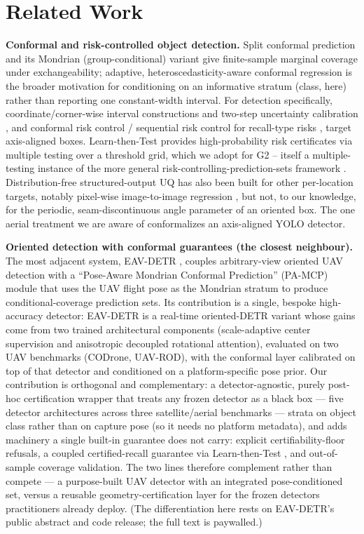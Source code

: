 \documentclass[11pt]{article}
\begin{document}
\section{Related Work}\label{sec:related}
\textbf{Conformal and risk-controlled object detection.} Split conformal prediction \citep{vovk2005algorithmic}
and its Mondrian (group-conditional) variant \citep{vovk2003mondrian} give finite-sample marginal coverage
under exchangeability; adaptive, heteroscedasticity-aware conformal regression \citep{romano2019cqr} is the
broader motivation for conditioning on an informative stratum (class, here) rather than reporting one
constant-width interval. For detection specifically, coordinate/corner-wise interval constructions and two-step
uncertainty calibration \citep{andeol2023conformal,timans2024twostep,ries2026probabilistic}, and conformal
risk control / sequential risk control for recall-type risks \citep{angelopoulos2022crc,andeol2025seqcrc},
target axis-aligned boxes. Learn-then-Test \citep{angelopoulos2021ltt} provides high-probability risk
certificates via multiple testing over a threshold grid, which we adopt for G2 -- itself a multiple-testing
instance of the more general risk-controlling-prediction-sets framework \citep{bates2021rcps}. Distribution-free
structured-output UQ has also been built for other per-location targets, notably pixel-wise image-to-image
regression \citep{angelopoulos2022im2im}, but not, to our knowledge, for the periodic, seam-discontinuous
angle parameter of an oriented box. The one aerial treatment we
are aware of \citep{copley2024copa} conformalizes an axis-aligned YOLO detector.

\textbf{Oriented detection with conformal guarantees (the closest neighbour).} The most adjacent system,
EAV-DETR \citep{eavdetr2026}, couples arbitrary-view oriented UAV detection with a ``Pose-Aware
Mondrian Conformal Prediction'' (PA-MCP) module that uses the UAV flight pose as the Mondrian stratum
to produce conditional-coverage prediction sets. Its contribution is a single, bespoke high-accuracy detector:
EAV-DETR is a real-time oriented-DETR variant whose gains come from two trained architectural
components (scale-adaptive center supervision and anisotropic decoupled rotational attention), evaluated on
two UAV benchmarks (CODrone, UAV-ROD), with the conformal layer calibrated on top of that detector and
conditioned on a platform-specific pose prior. Our contribution is orthogonal and complementary: a
detector-agnostic, purely post-hoc certification wrapper that treats any frozen detector as a
black box --- five detector architectures across three satellite/aerial benchmarks --- strata on object
class rather than on capture pose (so it needs no platform metadata), and adds machinery a single built-in
guarantee does not carry: explicit certifiability-floor refusals, a coupled certified-recall guarantee
via Learn-then-Test \citep{angelopoulos2021ltt}, and out-of-sample coverage validation. The two lines
therefore complement rather than compete --- a purpose-built UAV detector with an integrated pose-conditioned
set, versus a reusable geometry-certification layer for the frozen detectors practitioners already deploy.
(The differentiation here rests on EAV-DETR's public abstract and code release; the full text is paywalled.)
\end{document}
